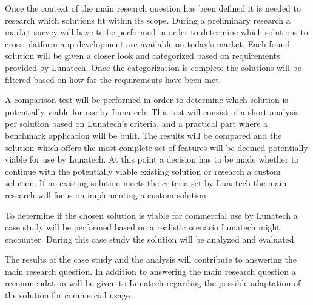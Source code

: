 Once the context of the main research question has been defined it is needed to research which solutions fit within its scope. During a preliminary research a market survey will have to be performed in order to determine which solutions to cross-platform app development are available on today's market. Each found solution will be given a closer look and categorized based on requirements provided by Lunatech. Once the categorization is complete the solutions will be filtered based on how far the requirements have been met.

A comparison test will be performed in order to determine which solution is potentially viable for use by Lunatech. This test will consist of a short analysis per solution based on Lunatech's criteria, and a practical part where a benchmark application will be built. The results will be compared and the solution which offers the most complete set of features will be deemed potentially viable for use by Lunatech. At this point a decision has to be made whether to continue with the potentially viable existing solution or research a custom solution. If no existing solution meets the criteria set by Lunatech the main research will focus on implementing a custom solution.

To determine if the chosen solution is viable for commercial use by Lunatech a case study will be performed based on a realistic scenario Lunatech might encounter. During this case study the solution will be analyzed and evaluated.

The results of the case study and the analysis will contribute to answering the main research question. In addition to answering the main research question a recommendation will be given to Lunatech regarding the possible adaptation of the solution for commercial usage.


